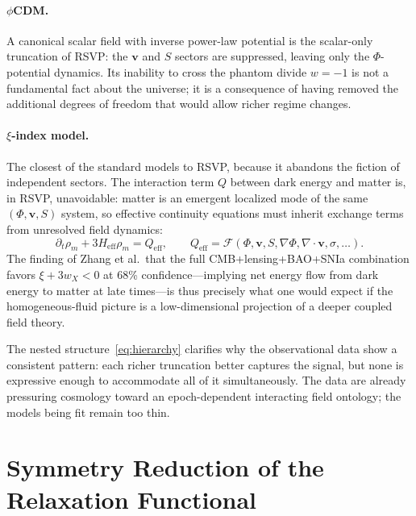 \documentclass[12pt,a4paper]{article}
\theoremstyle{remark}
\newcommand{\vv}{\mathbf{v}}
\newcommand{\Heff}{H_{\mathrm{eff}}}
\begin{document}
\paragraph{$\phi$CDM.} A canonical scalar field with inverse power-law potential is the scalar-only truncation of RSVP: the $\vv$ and $S$ sectors are suppressed, leaving only the $\Phi$-potential dynamics. Its inability to cross the phantom divide $w = -1$ is not a fundamental fact about the universe; it is a consequence of having removed the additional degrees of freedom that would allow richer regime changes.

\paragraph{$\xi$-index model.} The closest of the standard models to RSVP, because it abandons the fiction of independent sectors. The interaction term $Q$ between dark energy and matter is, in RSVP, unavoidable: matter is an emergent localized mode of the same $(\Phi, \vv, S)$ system, so effective continuity equations must inherit exchange terms from unresolved field dynamics:
\begin{equation}
\partial_t \rho_m + 3\Heff \rho_m = Q_{\mathrm{eff}},
\qquad
Q_{\mathrm{eff}} = \mathcal{F}(\Phi, \vv, S, \nabla\Phi, \nabla\cdot\vv, \sigma, \ldots).
\end{equation}
The finding of Zhang et al.\ that the full CMB+lensing+BAO+SNIa combination favors $\xi + 3w_X < 0$ at 68\% confidence---implying net energy flow from dark energy to matter at late times---is thus precisely what one would expect if the homogeneous-fluid picture is a low-dimensional projection of a deeper coupled field theory.

The nested structure~\eqref{eq:hierarchy} clarifies why the observational data show a consistent pattern: each richer truncation better captures the signal, but none is expressive enough to accommodate all of it simultaneously. The data are already pressuring cosmology toward an epoch-dependent interacting field ontology; the models being fit remain too thin.

\section{Symmetry Reduction of the Relaxation Functional}
\label{sec:symmetry}
\end{document}
